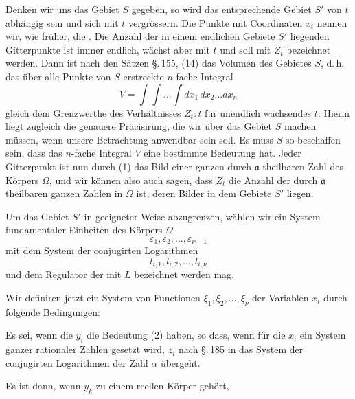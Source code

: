 Denken wir uns das Gebiet $S$ gegeben, so wird das entsprechende
 Gebiet $S'$ von $t$ abhängig sein und sich mit $t$ vergrössern.
Die Punkte mit  Coordinaten $x_i$ nennen
wir, wie früher, die . Die Anzahl der in einem
endlichen Gebiete $S'$ liegenden Gitterpunkte ist immer endlich,
wächst aber mit $t$ und soll mit $Z_t$ bezeichnet werden. Dann ist
nach den Sätzen \S.\,155, (14) das Volumen des Gebietes $S$, d.\,h. das
über alle Punkte von $S$ erstreckte $n$-fache Integral
\[
V = \int\!\!\int \ldots \int dx_1\, dx_2 \ldots dx_n
\]
gleich dem Grenzwerthe des Verhältnisses $Z_t : t$ für unendlich
wachsendes $t$:
Hierin liegt zugleich die genauere Präcisirung, die wir über
das Gebiet $S$ machen müssen, wenn unsere Betrachtung anwendbar
 sein soll. Es muss $S$ so beschaffen sein, dass das
$n$-fache Integral $V$ eine bestimmte Bedeutung hat. Jeder Gitterpunkt
 ist nun durch (1) das Bild einer ganzen durch $\mathfrak{a}$ theilbaren
 Zahl des Körpers $\Omega$, und wir können also auch sagen,
dass $Z_t$ die Anzahl der durch $\mathfrak{a}$ theilbaren ganzen Zahlen in $\Omega$
ist, deren Bilder in dem Gebiete $S'$ liegen.

Um das Gebiet $S'$ in geeigneter Weise abzugrenzen, wählen
wir ein System fundamentaler Einheiten des Körpers $\Omega$
\[
\varepsilon_1, \varepsilon_2, \ldots, \varepsilon_{\nu-1}
\]
mit dem System der conjugirten Logarithmen
\[
l_{i,1}, l_{i,2}, \ldots, l_{i,\nu}
\]
und dem Regulator
der mit $L$ bezeichnet werden mag.

Wir definiren jetzt ein System von Functionen $\xi_1, \xi_2, \ldots, \xi_\nu$
der Variablen $x_i$ durch folgende Bedingungen:

Es sei, wenn die $y_i$ die Bedeutung (2) haben,
so dass, wenn für die $x_i$ ein System ganzer rationaler Zahlen
gesetzt wird, $z_i$ nach \S.\,185 in das System der conjugirten
Logarithmen der Zahl $\alpha$ übergeht.

Es ist dann, wenn $y_k$ zu einem reellen Körper gehört,
